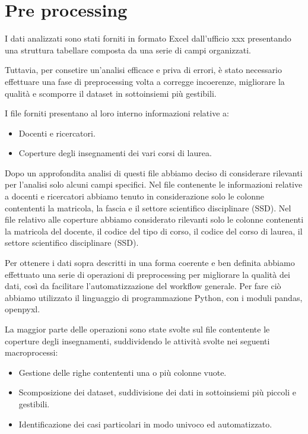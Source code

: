 \section{Pre processing}
\label{sec:pre-proc}



I dati analizzati sono stati forniti in formato Excel dall'ufficio xxx
presentando una struttura tabellare composta da una serie di campi organizzati.

Tuttavia, per consetire un'analisi efficace e priva di errori, è stato necessario effettuare una fase di
preprocessing volta a corregge incoerenze, migliorare la qualità e scomporre il dataset in sottoinsiemi
più gestibili.


I file forniti presentano al loro interno informazioni relative a:
\begin{itemize}
    \item Docenti e ricercatori.
    \item Coperture degli insegnamenti dei vari corsi di laurea.
\end{itemize}

Dopo un approfondita analisi di questi file abbiamo deciso di considerare rilevanti per l'analisi solo alcuni campi specifici.
Nel file contenente le informazioni relative a docenti e ricercatori abbiamo tenuto in considerazione solo le colonne contententi
la matricola, la fascia e il settore scientifico disciplinare (SSD).
Nel file relativo alle coperture abbiamo considerato rilevanti solo le colonne contenenti
la matricola del docente, il codice del tipo di corso, il codice del corso di laurea, il settore scientifico disciplinare (SSD).

Per ottenere i dati sopra descritti in una forma coerente e ben definita abbiamo effettuato una serie di operazioni di preprocessing
per migliorare la qualità dei dati, così da facilitare l'automatizzazione del workflow generale.
Per fare ciò abbiamo utilizzato il linguaggio di programmazione Python, con i moduli pandas, openpyxl.

La maggior parte delle operazioni sono state svolte sul file contentente le coperture degli insegnamenti,
suddividendo le attività svolte nei seguenti macroprocessi:
\begin{itemize}
    \item Gestione delle righe contententi una o più colonne vuote.
    \item Scomposizione dei dataset, suddivisione dei dati in sottoinsiemi più piccoli e gestibili.
    \item Identificazione dei casi particolari in modo univoco ed automatizzato.
\end{itemize}


